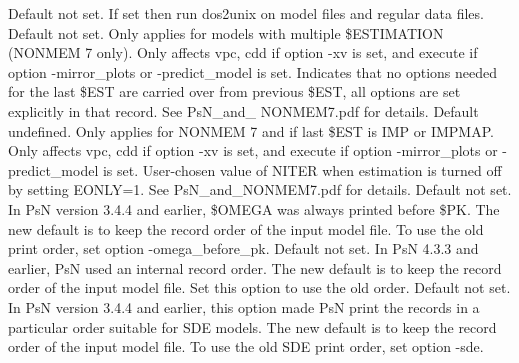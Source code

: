 \begin{optionlist}
Default not set. If set then run dos2unix on model files and regular data files.
\nextopt
{}
Default not set. Only applies for models with multiple \$ESTIMATION (NONMEM 7 only). Only affects vpc,  cdd if option -xv is set, and execute if option -mirror\_plots or -predict\_model is set. Indicates that no options needed for the last \$EST are carried over from previous \$EST, all options are set explicitly in that record. See PsN\_and\_ NONMEM7.pdf for details. 
\nextopt
{}
Default undefined. Only applies for NONMEM 7 and if last \$EST is IMP or IMPMAP.  Only affects vpc,  cdd if option -xv is set, and execute if option -mirror\_plots or -predict\_model is set. User-chosen value of NITER when estimation is turned off by setting EONLY=1. See PsN\_and\_NONMEM7.pdf for details. 
\nextopt
{}
Default not set. In PsN version 3.4.4 and earlier, \$OMEGA was always printed before \$PK. The new default is to keep the record order of the input model file. To use the old print order, set option -omega\_before\_pk.
\nextopt
{}
Default not set. In PsN 4.3.3 and earlier, PsN used an internal record order. The new default is to keep the record order of the input model file. Set this option to use the old order.
\nextopt
{}
Default not set. In PsN version 3.4.4 and earlier, this option made PsN print the records in a particular order suitable for SDE models. The new default is to keep the record order of the input model file. To use the old SDE print order, set option -sde.
\nextopt
\end{optionlist}
